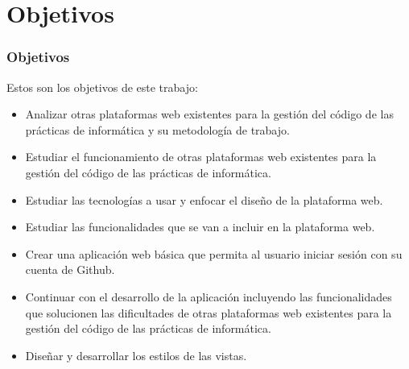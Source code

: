\documentclass{beamer}
\begin{document}
\section{Objetivos}
\begin{frame}
  \frametitle{Objetivos}
  
  Estos son los objetivos de este trabajo:

  \begin{itemize}
    \item Analizar otras plataformas  web existentes para la gestión del código de las prácticas de informática y su metodología de trabajo.
    \item Estudiar el funcionamiento de otras plataformas  web existentes para la gestión del código de las prácticas de informática.
    \item Estudiar las tecnologías a usar y enfocar el diseño de la plataforma web.
    \item Estudiar las funcionalidades que se van a incluir en la plataforma web.
  \end{itemize}

  \framebreak

  \begin{itemize}
    \item Crear una aplicación web básica que permita al usuario iniciar sesión con su cuenta de Github.
    \item Continuar con el desarrollo de la aplicación incluyendo las funcionalidades que solucionen las dificultades de otras plataformas  web existentes para la gestión del código de las prácticas de informática.
    \item Diseñar y desarrollar los estilos de las vistas.
  \end{itemize}
  
\end{frame}

\end{document}
